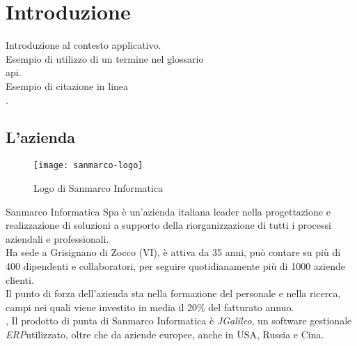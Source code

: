 
\chapter{Introduzione}
\label{cap:introduzione}

Introduzione al contesto applicativo.\\

\noindent Esempio di utilizzo di un termine nel glossario \\
\gls{api}. \\

\noindent Esempio di citazione in linea \\
\cite{site:agile-manifesto}. \\


\section{L'azienda}



\begin{figure}[h]
\centering
\texttt{[image: sanmarco-logo]}
\caption{Logo di Sanmarco Informatica}
\end{figure}
Sanmarco Informatica Spa è un'azienda italiana leader nella progettazione e realizzazione di soluzioni a supporto della riorganizzazione di tutti i processi aziendali e professionali. \\ Ha sede a  Grisignano di Zocco (VI), è attiva da 35 anni, può contare su più di 400 dipendenti e collaboratori, per seguire quotidianamente più di 1000 aziende clienti. \\ 
Il punto di forza dell'azienda sta nella formazione del personale e nella ricerca, campi nei quali viene investito in media il 20\% del fatturato annuo. \\,
Il prodotto di punta di  Sanmarco Informatica è \emph{JGalileo}, un software gestionale \emph{ERP}\glsfirstoccur utilizzato, oltre che da aziende europee, anche in USA, Russia e Cina.\\

